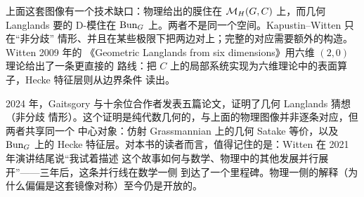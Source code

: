 上面这套图像有一个技术缺口：物理给出的膜住在 $\mathcal{M}_{H}(G,C)$ 上，而几何 Langlands
要的 D-模住在 $\operatorname{Bun}_{G}$ 上。两者不是同一个空间。Kapustin--Witten 只在“非分歧”
情形、并且在某些极限下把两边对上；完整的对应需要额外的构造。Witten 2009 年的
《Geometric Langlands from six dimensions》用六维 $(2,0)$ 理论给出了一条更直接的
路线：把 $C$ 上的局部系统实现为六维理论中的表面算子，Hecke 特征层则从边界条件
读出。

2024 年，Gaitsgory 与十余位合作者发表五篇论文，证明了几何 Langlands 猜想（非分歧
情形）。这个证明是纯代数几何的，与上面的物理图像并非逐条对应，但两者共享同一个
中心对象：仿射 Grassmannian 上的几何 Satake 等价，以及 $\operatorname{Bun}_{G}$ 上的 Hecke
特征层。对本书的读者而言，值得记住的是：Witten 在 2021 年演讲结尾说“我试着描述
这个故事如何与数学、物理中的其他发展并行展开”——三年后，这条并行线在数学一侧
到达了一个里程碑。物理一侧的解释（为什么偏偏是这套镜像对称）至今仍是开放的。

